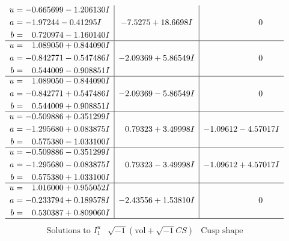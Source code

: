 \documentclass[1p]{elsarticle_modified}
\theoremstyle{definition}
\newcommand{\I}{\sqrt{-1}}
\begin{document}
$$\begin{array}{c|c|c}
\begin{aligned}
u &= -0.665699 - 1.206130 I \\
a &= -1.97244 - 0.41295 I \\
b &= \phantom{-}0.720974 - 1.160140 I\end{aligned}
 & -7.5275 + 18.6698 I & \phantom{-0.000000 } 0 \\ \hline\begin{aligned}
u &= \phantom{-}1.089050 + 0.844090 I \\
a &= -0.842771 - 0.547486 I \\
b &= \phantom{-}0.544009 - 0.908851 I\end{aligned}
 & -2.09369 + 5.86549 I & \phantom{-0.000000 } 0 \\ \hline\begin{aligned}
u &= \phantom{-}1.089050 - 0.844090 I \\
a &= -0.842771 + 0.547486 I \\
b &= \phantom{-}0.544009 + 0.908851 I\end{aligned}
 & -2.09369 - 5.86549 I & \phantom{-0.000000 } 0 \\ \hline\begin{aligned}
u &= -0.509886 + 0.351299 I \\
a &= -1.295680 + 0.083875 I \\
b &= \phantom{-}0.575380 - 1.033100 I\end{aligned}
 & \phantom{-}0.79323 + 3.49998 I & -1.09612 - 4.57017 I \\ \hline\begin{aligned}
u &= -0.509886 - 0.351299 I \\
a &= -1.295680 - 0.083875 I \\
b &= \phantom{-}0.575380 + 1.033100 I\end{aligned}
 & \phantom{-}0.79323 - 3.49998 I & -1.09612 + 4.57017 I \\ \hline\begin{aligned}
u &= \phantom{-}1.016000 + 0.955052 I \\
a &= -0.233794 + 0.189578 I \\
b &= \phantom{-}0.530387 + 0.809060 I\end{aligned}
 & -2.43556 + 1.53810 I & \phantom{-0.000000 } 0\\
 \hline 
 \end{array}$$\newpage$$\begin{array}{c|c|c}  
\text{Solutions to }I^u_{1}& \I (\text{vol} + \sqrt{-1}CS) & \text{Cusp shape}\\
 \hline 
\begin{aligned}

\end{aligned}
\end{array}$$
\end{document}
